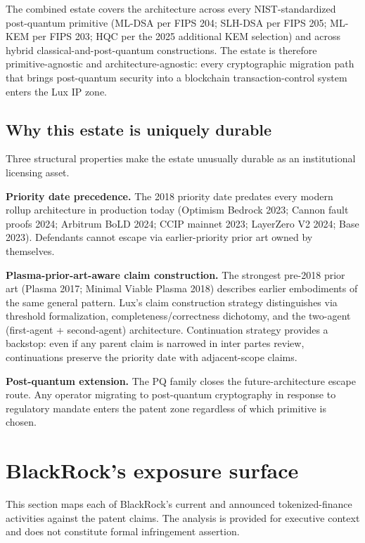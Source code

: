 \documentclass[11pt,letterpaper]{article}
\begin{document}
The combined estate covers the architecture across every NIST-standardized post-quantum primitive (ML-DSA per FIPS 204; SLH-DSA per FIPS 205; ML-KEM per FIPS 203; HQC per the 2025 additional KEM selection) and across hybrid classical-and-post-quantum constructions. The estate is therefore primitive-agnostic and architecture-agnostic: every cryptographic migration path that brings post-quantum security into a blockchain transaction-control system enters the Lux IP zone.

\subsection{Why this estate is uniquely durable}

Three structural properties make the estate unusually durable as an institutional licensing asset.

\textbf{Priority date precedence.} The 2018 priority date predates every modern rollup architecture in production today (Optimism Bedrock 2023; Cannon fault proofs 2024; Arbitrum BoLD 2024; CCIP mainnet 2023; LayerZero V2 2024; Base 2023). Defendants cannot escape via earlier-priority prior art owned by themselves.

\textbf{Plasma-prior-art-aware claim construction.} The strongest pre-2018 prior art (Plasma 2017; Minimal Viable Plasma 2018) describes earlier embodiments of the same general pattern. Lux's claim construction strategy distinguishes via threshold formalization, completeness/correctness dichotomy, and the two-agent (first-agent + second-agent) architecture. Continuation strategy provides a backstop: even if any parent claim is narrowed in inter partes review, continuations preserve the priority date with adjacent-scope claims.

\textbf{Post-quantum extension.} The PQ family closes the future-architecture escape route. Any operator migrating to post-quantum cryptography in response to regulatory mandate enters the patent zone regardless of which primitive is chosen.

\section{BlackRock's exposure surface}

This section maps each of BlackRock's current and announced tokenized-finance activities against the patent claims. The analysis is provided for executive context and does not constitute formal infringement assertion.
\end{document}

